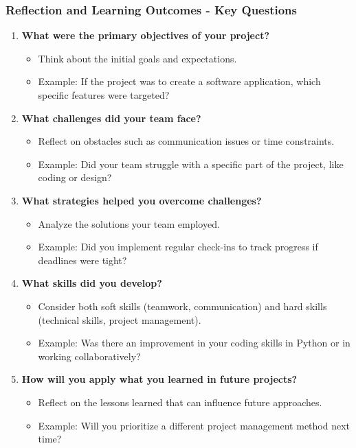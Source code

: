 \documentclass[aspectratio=169]{beamer}
\begin{document}
\begin{frame}[fragile]
    \frametitle{Reflection and Learning Outcomes - Key Questions}
    \begin{enumerate}
        \item \textbf{What were the primary objectives of your project?}
            \begin{itemize}
                \item Think about the initial goals and expectations.
                \item Example: If the project was to create a software application, which specific features were targeted?
            \end{itemize}
        
        \item \textbf{What challenges did your team face?}
            \begin{itemize}
                \item Reflect on obstacles such as communication issues or time constraints.
                \item Example: Did your team struggle with a specific part of the project, like coding or design?
            \end{itemize}
        
        \item \textbf{What strategies helped you overcome challenges?}
            \begin{itemize}
                \item Analyze the solutions your team employed.
                \item Example: Did you implement regular check-ins to track progress if deadlines were tight?
            \end{itemize}

        \item \textbf{What skills did you develop?}
            \begin{itemize}
                \item Consider both soft skills (teamwork, communication) and hard skills (technical skills, project management).
                \item Example: Was there an improvement in your coding skills in Python or in working collaboratively?
            \end{itemize}

        \item \textbf{How will you apply what you learned in future projects?}
            \begin{itemize}
                \item Reflect on the lessons learned that can influence future approaches.
                \item Example: Will you prioritize a different project management method next time?
            \end{itemize}
    \end{enumerate}
\end{frame}
\end{document}
